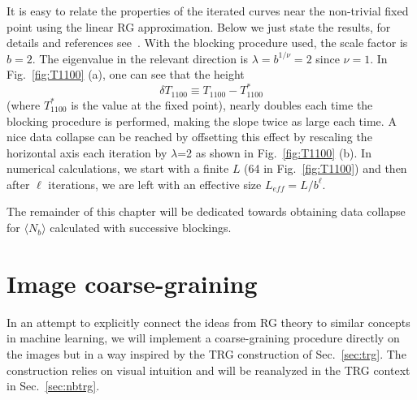 \documentclass[../main.tex]{subfiles}
\begin{document}
It is easy to relate the properties of the iterated curves near the non-trivial fixed point using the linear RG
approximation.  Below we just state the results, for details and references see~\cite{prb87}.  With the blocking
procedure used, the scale factor is $b=2$. The eigenvalue in the relevant direction is $\lambda=b^{1/\nu}=2$ since
$\nu=1$. In Fig.~\ref{fig:T1100} (a), one can see that the height
\begin{equation}
    \delta T_{1100} \equiv T_{1100} - T_{1100}^{*}
\end{equation}
(where $T_{1100}^{*}$ is the value at the fixed point), nearly doubles each time the blocking procedure is performed,
making the slope twice as large each time.
A nice data collapse can be reached by offsetting this effect by rescaling the horizontal axis each iteration by
$\lambda$=2 as shown in Fig.~\ref{fig:T1100} (b). In numerical calculations, we start with a finite $L$ (64 in
Fig.~\ref{fig:T1100}) and then after $\ell$ iterations, we are left with an effective size $L_{eff}=L/b^\ell$. 

The remainder of this chapter will be dedicated towards obtaining data collapse for $\langle N_b \rangle$ calculated with
successive blockings.

\section{Image coarse-graining}
\label{sec:rgimages}

In an attempt to explicitly connect the ideas from RG theory to similar concepts in machine learning, we will implement
a coarse-graining procedure directly on the images but in a way inspired by the TRG construction of Sec.~\ref{sec:trg}.
The construction relies on visual intuition and will be reanalyzed in the TRG context in Sec.~\ref{sec:nbtrg}.
\end{document}
